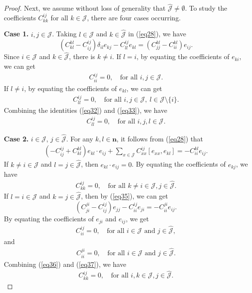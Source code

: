 \documentclass[reqno]{amsart}
\theoremstyle{plain}
\theoremstyle{definition}
\begin{document}
\begin{proof}
Next, we assume without loss of generality that $\hat{\mathcal{J}} \neq \emptyset$.
To study the coefficients $C_{kk}^{ij}$ for all $k\in \mathcal{J}$, there are four cases occurring.

\textbf{Case 1.} $i, j \in \mathcal{J}$. Taking $l\in \mathcal{J}$ and $k \in \hat{\mathcal{J}}$ in (\ref{eq28}),
we have
\[
\left( C_{kl}^{kl} - C_{ij}^{ij} \right) \delta_{il} e_{kj} - C_{ll}^{ij} e_{kl} = \left( C_{jj}^{kl} - C_{ii}^{kl} \right) e_{ij}.
\]
Since $i \in \mathcal{J}$ and $k \in \hat{\mathcal{J}}$, there is $k \neq i$.
If $l = i$, by equating the coefficients of $e_{ki}$, we can get
 \begin{align}\label{eq32}
C_{ii}^{ij} = 0, \quad \text{for all } i, j \in \mathcal{J}.
\end{align}
If $l \neq i$, by equating the coefficients of $e_{kl}$,
we can get
 \begin{align}\label{eq33}
C_{ll}^{ij} = 0, \quad \text{for all } i, j \in \mathcal{J},~ l \in \mathcal{J} \setminus \{i\}.
 \end{align}
Combining the identities (\ref{eq32}) and (\ref{eq33}),
we have
 \begin{align}\label{eq34}
C_{ll}^{ij} = 0, \quad \text{for all } i, j, l \in \mathcal{J}.
 \end{align}

\textbf{Case 2.} $i \in \mathcal{J}$, $j \in \hat{\mathcal{J}}$. For any $k, l \in \mathbf{n}$, it follows from (\ref{eq28}) that
 \begin{align}\label{eq35}
\left( -C_{ij}^{ij} + C_{kl}^{kl} \right) e_{kl} \cdot  e_{ij} + \sum_{x \in \mathcal{J}} C_{xx}^{ij} [e_{xx}, e_{kl}] = -C_{ii}^{kl} e_{ij}. 
\end{align}
If $k \neq i \in \mathcal{J}$ and $l = j \in \hat{\mathcal{J}}$, then $e_{kl} \cdot  e_{ij} = 0$. By equating the coefficients of $e_{kj}$, we have
 \begin{align}\label{eq36}
C_{kk}^{ij} = 0, \quad \text{for all } k \neq i \in \mathcal{J}, j \in \hat{\mathcal{J}}.
 \end{align}
If $l = i \in \mathcal{J}$ and $k = j \in \hat{\mathcal{J}}$, then by (\ref{eq35}), we can get
\[
\left( C_{ji}^{ji} - C_{ij}^{ij} \right) e_{jj} - C_{ii}^{ij} e_{ji} = -C_{ii}^{ji} e_{ij}.
\]
By equating the coefficients of $e_{ji}$ and $e_{ij}$, we get
 \begin{align}\label{eq37}
C_{ii}^{ij} = 0, \quad \text{for all } i \in \mathcal{J} \text{ and } j \in \hat{\mathcal{J}},
\end{align}
and
 \begin{align}\label{eq38}
C_{ii}^{ji} = 0, \quad \text{for all } i \in \mathcal{J} \text{ and } j \in \hat{\mathcal{J}}.
 \end{align}
Combining (\ref{eq36}) and (\ref{eq37}), we have
 \begin{align}\label{eq39}
C_{kk}^{ij} = 0, \quad \text{for all } i, k \in \mathcal{J}, j \in \hat{\mathcal{J}}.
 \end{align}


\end{proof}
\end{document}
